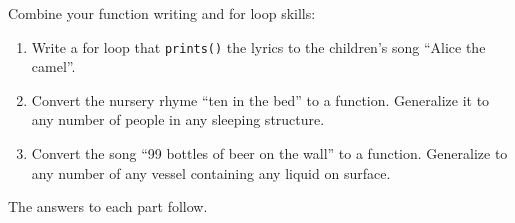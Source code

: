 \documentclass[]{book}
\theoremstyle{plain}
\theoremstyle{remark}
\theoremstyle{definition}
\theoremstyle{definition}
\theoremstyle{definition}
\theoremstyle{remark}
\begin{document}
Combine your function writing and for loop skills:

\begin{enumerate}
\def\labelenumi{\arabic{enumi}.}
\item
  Write a for loop that \texttt{prints()} the lyrics to the children's
  song ``Alice the camel''.
\item
  Convert the nursery rhyme ``ten in the bed'' to a function. Generalize
  it to any number of people in any sleeping structure.
\item
  Convert the song ``99 bottles of beer on the wall'' to a function.
  Generalize to any number of any vessel containing any liquid on
  surface.
\end{enumerate}

The answers to each part follow.
\end{document}
